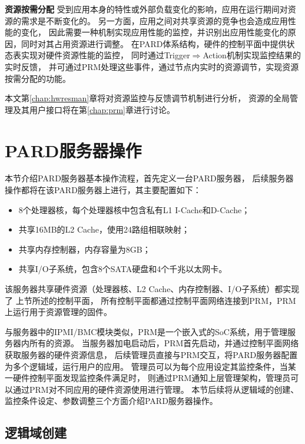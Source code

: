 \textbf{资源按需分配}\quad
受到应用本身的特性或外部负载变化的影响，应用在运行期间对资源的需求是不断变化的。
另一方面，应用之间对共享资源的竞争也会造成应用性能的变化，
因此需要一种机制实现应用性能的监控，并识别出应用性能变化的原因，同时对其占用资源进行调整。
在PARD体系结构，硬件的控制平面中提供状态表实现对硬件资源性能的监控，
同时通过Trigger$\Rightarrow$Action机制实现监控结果的实时反馈，
并可通过PRM处理这些事件，通过节点内实时的资源调节，实现资源按需分配的功能。

本文第\ref{chap:hwresman}章将对资源监控与反馈调节机制进行分析，
资源的全局管理及其用户接口将在第\ref{chap:prm}章进行讨论。


\iffalse

\section{PARD服务器操作}

本节介绍PARD服务器基本操作流程，首先定义一台PARD服务器，
后续服务器操作都将在该PARD服务器上进行，其主要配置如下：

\begin{itemize}
  \item 8个处理器核，每个处理器核中包含私有L1 I-Cache和D-Cache；
  \item 共享16MB的L2 Cache，使用24路组相联映射；
  \item 共享内存控制器，内存容量为8GB；
  \item 共享I/O子系统，包含8个SATA硬盘和4个千兆以太网卡。
\end{itemize}

该服务器共享硬件资源（处理器核、L2 Cache、内存控制器、I/O子系统）都实现了
上节所述的控制平面，%
所有控制平面都通过控制平面网络连接到PRM，PRM上运行用于资源管理的固件。

与服务器中的IPMI/BMC模块\cite{ipmi}类似，PRM是一个嵌入式的SoC系统，用于管理服务器内所有的资源。
当服务器加电启动后，PRM首先启动，并通过控制平面网络获取服务器的硬件资源信息，
后续管理员直接与PRM交互，将PARD服务器配置为多个逻辑域，运行用户的应用。
管理员可以为每个应用设定其监控条件，当某一硬件控制平面发现监控条件满足时，
则通过PRM通知上层管理架构，管理员可以通过PRM对不同应用的硬件资源使用进行管理。
本节后续将从逻辑域的创建、监控条件设定、参数调整三个方面介绍PARD服务器操作。

\subsection{逻辑域创建}

